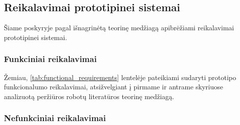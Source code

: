 \subsection{Reikalavimai prototipinei sistemai}
Šiame poskyryje pagal išnagrinėtą teorinę medžiagą apibrėžiami reikalavimai prototipinei sistemai.
\subsubsection{Funkciniai reikalavimai}
Žemiau, \ref{tab:functional_requirements} lentelėje pateikiami sudaryti prototipo funkcionalumo reikalavimai, atsižvelgiant į pirmame ir antrame skyriuose analizuotą peržiūros robotų literatūros teorinę medžiagą.


\subsubsection{Nefunkciniai reikalavimai}
